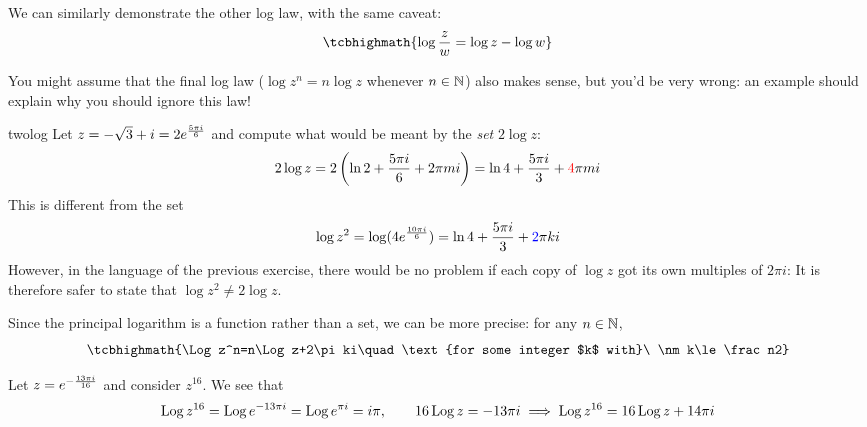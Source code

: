 We can similarly demonstrate the other log law, with the same caveat:
\[\tcbhighmath{\log\frac zw=\log z-\log w}\]

You might assume that the final log law ($\log z^n=n\log z$ whenever $n\in\mathbb{N}$) also makes sense, but you'd be very wrong: an example should explain why you should ignore this law!

\begin{example}{}{twolog}
Let $z=-\sqrt 3+i=2e^{\frac{5\pi i}{6}}$ and compute what would be meant by the \emph{set} $2\log z$:
\[2\log z=2\left(\ln 2+\frac{5\pi i}6 +2\pi mi\right)=\ln 4+\frac{5\pi i}3+\textcolor{red}{4}\pi mi\]
This is different from the set
\[\log z^2=\log(4e^{\frac{10\pi i}{6}})=\ln 4+\frac{5\pi i}3+\textcolor{blue}{2}\pi ki\]
However, in the language of the previous exercise, there would be no problem if each copy of $\log z$ got its own multiples of $2\pi i$:
It is therefore safer to state that $\log z^2\neq 2\log z$.
\end{example}

Since the principal logarithm is a function rather than a set, we can be more precise: for any $n\in\mathbb{N}$,
\[\tcbhighmath{\Log z^n=n\Log z+2\pi ki\quad\text{for some integer $k$ with}\ \nm k\le \frac n2}\]

\begin{example}{}{}
Let $z=e^{-\frac{13\pi i}{16}}$ and consider $z^{16}$. We see that
\[\operatorname{Log} z^{16}=\operatorname{Log} e^{-13\pi i}=\operatorname{Log} e^{\pi i} =i\pi,\qquad 16\operatorname{Log} z=-13\pi i \implies \operatorname{Log} z^{16}=16\operatorname{Log} z+14\pi i\]
\end{example}


